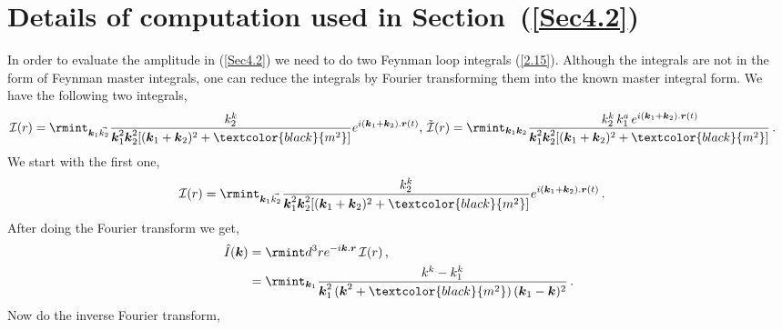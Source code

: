 \section{Details of computation used in Section~(\ref{Sec4.2})}\label{ch1:app:A}
In order to evaluate the amplitude in (\ref{Sec4.2}) we need to do two  Feynman loop integrals (\ref{2.15}). Although the integrals are not in the form of Feynman master integrals, one can reduce the integrals by Fourier transforming them into the known master integral form. We have the following two integrals,
\begin{align}
    \begin{split}
       & \mathcal{I}(r)=\rmint_{\boldsymbol{k}_1\Vec{{k_2}}} \frac{k_2^k}{\boldsymbol{k}_1^2\boldsymbol{k}_2^2[(\boldsymbol{k}_1+\boldsymbol{k}_2)^2+\textcolor{black}{m^2}]}e^{i(\boldsymbol{k}_1+\boldsymbol{k}_2).\boldsymbol{r}(t)},\,\Tilde{\mathcal{I}}(r)=\rmint_{\boldsymbol{k}_1\boldsymbol{k}_2}\frac{\,k_2^k\, k_1^a\,e^{i(\boldsymbol{k}_1+\boldsymbol{k}_2).\boldsymbol{r}(t)}}{\boldsymbol{k}_1^2\boldsymbol{k}_2^2[(\boldsymbol{k}_1+\boldsymbol{k}_2)^2+\textcolor{black}{m^2}]}\,.
    \end{split}
\end{align}
We start with the first one,
\begin{align}
    \begin{split}
      &  \mathcal{I}(r)=\rmint_{\boldsymbol{k}_1\Vec{{k_2}}} \frac{k_2^k}{\boldsymbol{k}_1^2\boldsymbol{k}_2^2[(\boldsymbol{k}_1+\boldsymbol{k}_2)^2+\textcolor{black}{m^2}]}e^{i(\boldsymbol{k}_1+\boldsymbol{k}_2).\boldsymbol{r}(t)}\,.
    \end{split}
\end{align}
After doing the Fourier transform we get,
\begin{align}
    \begin{split}
        \hat{I}(\boldsymbol{k})&=\rmint d^3r e^{-i\boldsymbol{k}.\boldsymbol{r}}\,\mathcal{I}(r)\,,\\ &
        =\rmint_{\boldsymbol{k}_1}\frac{k^k-k_1^k}{\boldsymbol{k}_1^2\,(\boldsymbol{k}^2+\textcolor{black}{m^2})\,(\boldsymbol{k}_1-\boldsymbol{k})^2}\,.
    \end{split}
\end{align}
Now do the inverse Fourier transform,
